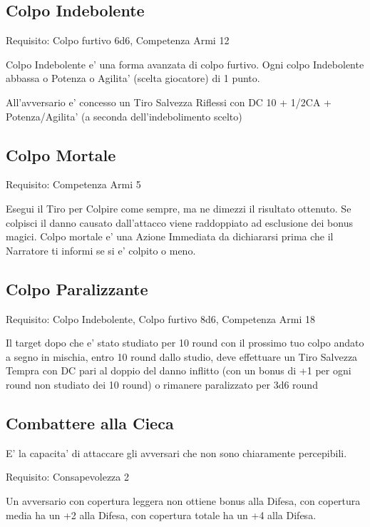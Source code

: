 \documentclass[a4paper,11pt,twoside,openany]{book}
\begin{document}
	\subsection{Colpo Indebolente}
	
	Requisito: Colpo furtivo 6d6, Competenza Armi 12
	
	Colpo Indebolente e' una forma avanzata di colpo furtivo. Ogni colpo
	Indebolente abbassa o Potenza o Agilita' (scelta giocatore) di 1 punto.
	
	All'avversario e' concesso un Tiro Salvezza Riflessi con DC 10 + 1/2CA + Potenza/Agilita' (a seconda dell'indebolimento scelto)
	
	\subsection{Colpo Mortale}
	
	Requisito: Competenza Armi 5
	
	Esegui il Tiro per Colpire come sempre, ma ne dimezzi il risultato ottenuto. Se colpisci il danno causato dall'attacco viene raddoppiato ad esclusione dei bonus magici. Colpo mortale e' una Azione Immediata da dichiararsi prima che il Narratore ti informi se si e' colpito o meno.
	
	\subsection{Colpo Paralizzante}
	
	Requisito: Colpo Indebolente, Colpo furtivo 8d6, Competenza Armi 18
	
	Il target dopo che e' stato studiato per 10 round con il prossimo tuo colpo andato a segno in mischia, entro 10 round dallo studio, deve effettuare un Tiro Salvezza Tempra con DC pari al doppio del danno inflitto (con un bonus di +1 per ogni round non studiato dei 10 round) o rimanere paralizzato per 3d6 round
	
	\subsection{Combattere alla Cieca}
	
	E' la capacita' di attaccare gli avversari che non sono chiaramente percepibili.
	
	Requisito: Consapevolezza 2
	
	Un avversario con copertura leggera non ottiene bonus alla Difesa, con copertura media ha un +2 alla Difesa, con copertura totale ha un +4 alla Difesa.
	
\end{document}
